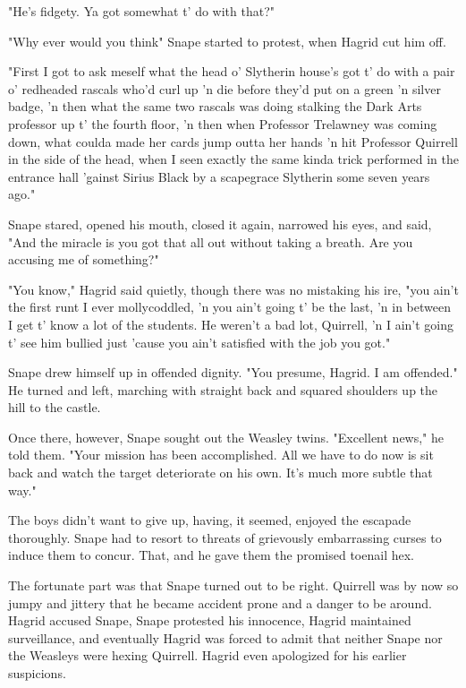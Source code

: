 "He's fidgety. Ya got somewhat t' do with that?"

"Why ever would you think{\el}" Snape started to protest, when Hagrid cut him off.

"First I got to ask meself what the head o' Slytherin house's got t' do with a pair o' redheaded rascals who'd curl up 'n die before they'd put on a green 'n silver badge, 'n then what the same two rascals was doing stalking the Dark Arts professor up t' the fourth floor, 'n then when Professor Trelawney was coming down, what coulda made her cards jump outta her hands 'n hit Professor Quirrell in the side of the head, when I seen exactly the same kinda trick performed in the entrance hall 'gainst Sirius Black by a scapegrace Slytherin some seven years ago."

Snape stared, opened his mouth, closed it again, narrowed his eyes, and said, "And the miracle is you got that all out without taking a breath. Are you accusing me of something?"

"You know," Hagrid said quietly, though there was no mistaking his ire, "you ain't the first runt I ever mollycoddled, 'n you ain't going t' be the last, 'n in between I get t' know a lot of the students. He weren't a bad lot, Quirrell, 'n I ain't going t' see him bullied just 'cause you ain't satisfied with the job you got."

Snape drew himself up in offended dignity. "You presume, Hagrid. I am offended." He turned and left, marching with straight back and squared shoulders up the hill to the castle.

Once there, however, Snape sought out the Weasley twins. "Excellent news," he told them. "Your mission has been accomplished. All we have to do now is sit back and watch the target deteriorate on his own. It's much more subtle that way."

The boys didn't want to give up, having, it seemed, enjoyed the escapade thoroughly. Snape had to resort to threats of grievously embarrassing curses to induce them to concur. That, and he gave them the promised toenail hex.

The fortunate part was that Snape turned out to be right. Quirrell was by now so jumpy and jittery that he became accident prone and a danger to be around. Hagrid accused Snape, Snape protested his innocence, Hagrid maintained surveillance, and eventually Hagrid was forced to admit that neither Snape nor the Weasleys were hexing Quirrell. Hagrid even apologized for his earlier suspicions.

